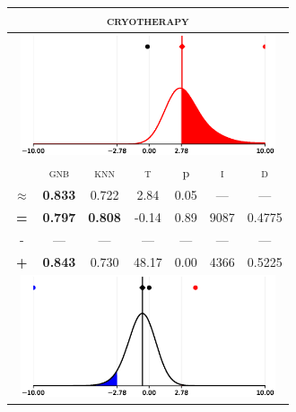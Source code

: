 \begin{tabular}{c||cc||c|c|c||c}
	\toprule
	\multicolumn{7}{c}{\textsc{cryotherapy}}\\
	\bottomrule
	\multicolumn{7}{c}{\includegraphics[width=7.5cm, trim=30 0 30 0]{figures/cryotherapy_0.eps}}\\

\midrule	&\textsc{gnb} & \textsc{knn} & \textsc{t} & p & \textsc{i} & \textsc{d}\\
	\color{red} $\approx$ & \color{red} \bfseries 0.833 &\color{red}   0.722 & 2.84 & 0.05 & --- & ---\\\midrule
	{\bfseries\color{black}\tiny=}& \color{black} \bfseries 0.797 & \color{black} \bfseries 0.808 & -0.14 & 0.89 & 9087 & \color{black} 0.4775\\
	{\tiny-}& --- & --- & --- & --- & --- & ---\\
	{\bfseries\color{red}\tiny+}& \color{red} \bfseries 0.843 & \color{red}  0.730 & 48.17 & 0.00 & 4366 & \color{red} 0.5225\\
	\bottomrule
	\multicolumn{7}{c}{\includegraphics[width=7.5cm, trim=30 0 30 0]{figures/cryotherapy_1.eps}}\\


\end{tabular}
